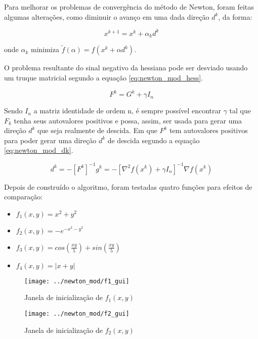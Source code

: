 Para melhorar os problemas de convergência do método de Newton, foram feitas algumas alterações, como diminuir o avanço em uma dada direção $ d^k $, da forma:

\begin{equation}
	x^{k+1} = x^k + \alpha_k d^k
\end{equation}

onde $ \alpha_k $ minimiza $ \tilde{f}(\alpha) = f(x^k + \alpha d^k) $.

O problema resultante do sinal negativo da hessiana pode ser desviado usando um truque matricial segundo a equação \ref{eq:newton_mod_hess}. 

\begin{equation}
	F^k = G^k + \gamma I_n
	\label{eq:newton_mod_hess}
\end{equation}

Sendo $ I_n $ a matriz identidade de ordem n, é sempre possível encontrar $ \gamma $ tal que $ F_k $ tenha seus autovalores positivos e possa, assim, ser usada para gerar uma direção $ d^k $ que seja realmente de descida.
Em que $ F^k $ tem autovalores positivos para poder gerar uma direção $ d^k $ de descida segundo a equação \ref{eq:newton_mod_dk}.

\begin{equation}
	d^k = -[F^k]^{-1}g^k = -[\nabla^2 f(x^k) + \gamma I_n]^{-1}\nabla f(x^k)
	\label{eq:newton_mod_dk}
\end{equation}

Depois de construído o algoritmo, foram testadas quatro funções para efeitos de comparação:

\begin{itemize}
	\item $ f_1(x,y) = x^2 + y^2$
	\item $ f_2(x,y) = -e^{-x^2 -y^2}$
	\item $ f_3(x,y) = cos(\frac{xy}{5})+sin(\frac{xy}{5}) $
	\item $ f_4(x,y) = |x+y| $
\end{itemize}

\newpage


\begin{figure}[H]
	\begin{center}
		\texttt{[image: ../newton\_mod/f1\_gui]}   
		\caption{Janela de inicialização de $ f_1(x,y) $}
		\label{fig:newton_mod_f1_gui}
	\end{center}
\end{figure}

\begin{figure}[H]
	\begin{center}
		\texttt{[image: ../newton\_mod/f2\_gui]}   
		\caption{Janela de inicialização de $ f_2(x,y) $}
		\label{fig:newton_mod_f2_gui}
	\end{center}
\end{figure}

